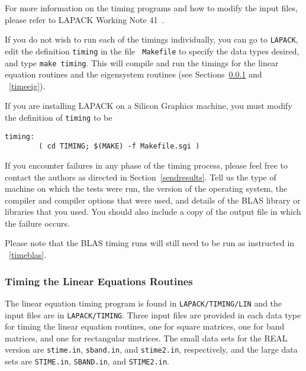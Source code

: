 For more information on the timing programs and how to modify the
input files, please refer to LAPACK Working Note 41~\cite{WN41}.

If you do not wish to run each of the timings individually, you can
go to {\tt LAPACK}, edit the definition {\tt timing} in the file {\tt
Makefile} to specify the data types desired, and type {\tt make
timing}.  This will compile
and run the timings for the linear equation routines and the eigensystem
routines (see Sections~\ref{timelin} and ~\ref{timeeig}). 

If you are installing LAPACK on a Silicon Graphics machine, you must
modify the definition of {\tt timing} to be
\begin{verbatim}
timing:
        ( cd TIMING; $(MAKE) -f Makefile.sgi )
\end{verbatim}

If you encounter failures in any phase of the timing process, please
feel free to contact the authors as directed in Section~\ref{sendresults}.
Tell us the 
type of machine on which the tests were run, the version of the operating
system, the compiler and compiler options that were used,
and details of the BLAS library or libraries that you used.  You should
also include a copy of the output file in which the failure occurs.

Please note that the BLAS
timing runs will still need to be run as instructed in ~\ref{timeblas}.

\subsubsection{Timing the Linear Equations Routines}\label{timelin}

\dent
The linear equation timing program is found in {\tt LAPACK/TIMING/LIN}
and the input files are in {\tt LAPACK/TIMING}.
Three input files are provided in each data type for timing the
linear equation routines, one for square matrices, one for band
matrices, and one for rectangular matrices.  The small data sets for the REAL version
are {\tt stime.in}, {\tt sband.in}, and {\tt stime2.in}, respectively,
and the large data sets are
{\tt STIME.in}, {\tt SBAND.in}, and {\tt STIME2.in}.

